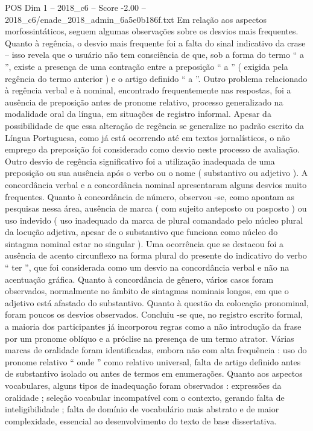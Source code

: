 \begin{textsample}{POS Dim 1 – 2018\_c6 – Score -2.00 – 2018\_c6/enade\_2018\_admin\_6a5e0b186f.txt}
Em relação aos aspectos morfossintáticos, seguem algumas observações sobre os desvios mais frequentes.
Quanto à regência, o desvio mais frequente foi a falta do sinal indicativo da crase – isso revela que o usuário não tem consciência de que, sob a forma do termo “ a ”, existe a presença de uma contração entre a preposição “ a ” ( exigida pela regência do termo anterior ) e o artigo definido “ a ”.
Outro problema relacionado à regência verbal e à nominal, encontrado frequentemente nas respostas, foi a ausência de preposição antes de pronome relativo, processo generalizado na modalidade oral da língua, em situações de registro informal.
Apesar da possibilidade de que essa alteração de regência se generalize no padrão escrito da Língua Portuguesa, como já está ocorrendo até em textos jornalísticos, o não emprego da preposição foi considerado como desvio neste processo de avaliação.
Outro desvio de regência significativo foi a utilização inadequada de uma preposição ou sua ausência após o verbo ou o nome ( substantivo ou adjetivo ).
A concordância verbal e a concordância nominal apresentaram alguns desvios muito frequentes.
Quanto à concordância de número, observou -se, como apontam as pesquisas nessa área, ausência de marca ( com sujeito anteposto ou posposto ) ou uso indevido ( uso inadequado da marca de plural comandado pelo núcleo plural da locução adjetiva, apesar de o substantivo que funciona como núcleo do sintagma nominal estar no singular ).
Uma ocorrência que se destacou foi a ausência de acento circunflexo na forma plural do presente do indicativo do verbo “ ter ”, que foi considerada como um desvio na concordância verbal e não na acentuação gráfica.
Quanto à concordância de gênero, vários casos foram observados, normalmente no âmbito de sintagmas nominais longos, em que o adjetivo está afastado do substantivo.
Quanto à questão da colocação pronominal, foram poucos os desvios observados.
Concluiu -se que, no registro escrito formal, a maioria dos participantes já incorporou regras como a não introdução da frase por um pronome oblíquo e a próclise na presença de um termo atrator.
Várias marcas de oralidade foram identificadas, embora não com alta frequência : uso do pronome relativo “ onde ” como relativo universal, falta de artigo definido antes de substantivo isolado ou antes de termos em enumerações.
Quanto aos aspectos vocabulares, alguns tipos de inadequação foram observados : expressões da oralidade ; seleção vocabular incompatível com o contexto, gerando falta de inteligibilidade ; falta de domínio de vocabulário mais abstrato e de maior complexidade, essencial ao desenvolvimento do texto de base dissertativa.

\end{textsample}
